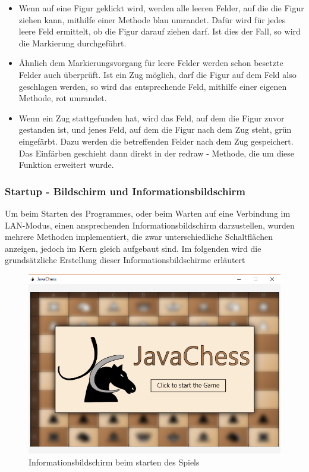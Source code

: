 \documentclass[12pt,a4paper]{article}
\begin{document}
{\begin{itemize}
\item{Wenn auf eine Figur geklickt wird, werden alle leeren Felder, auf die die Figur ziehen kann, mithilfe einer Methode blau umrandet. Dafür wird für jedes leere Feld ermittelt, ob die Figur darauf ziehen darf. Ist dies der Fall, so wird die Markierung durchgeführt. }

\item{Ähnlich dem Markierungsvorgang für leere Felder werden schon besetzte Felder auch überprüft. Ist ein Zug möglich, darf die Figur auf dem Feld also geschlagen werden, so wird das entsprechende Feld, mithilfe einer eigenen Methode, rot umrandet.}

\item{Wenn ein Zug stattgefunden hat, wird das Feld, auf dem die Figur zuvor gestanden ist, und jenes Feld, auf dem die Figur nach dem Zug steht, grün eingefärbt. Dazu werden die betreffenden Felder nach dem Zug gespeichert. Das Einfärben geschieht dann direkt in der redraw - Methode, die um diese Funktion erweitert wurde. }


\end{itemize}

\subsubsection{Startup - Bildschirm und Informationsbildschirm}
\label{SUBSUBSEC:BLURRYMENU}
Um beim Starten des Programmes, oder beim Warten auf eine Verbindung im LAN-Modus, einen ansprechenden Informationsbildschirm darzustellen, wurden mehrere Methoden implementiert, die zwar unterschiedliche Schaltflächen anzeigen, jedoch im Kern gleich aufgebaut sind. Im folgenden wird die grundsätzliche Erstellung dieser Informationsbildschirme erläutert\\
\begin{figure}[H]
  \centering
   	\includegraphics[width=14cm]{graphics/Startup.png}
  \caption{Informationsbildschirm beim starten des Spiels}
  \label{fig:Startup}
\end{figure}

}
\end{document}
